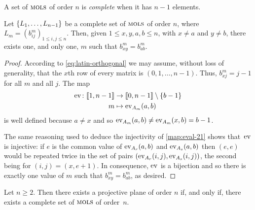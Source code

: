\begin{defn}
    A set of $\mols$ of order $n$ is \textsl{complete} when it has $n-1$ elements.
\end{defn}

\begin{lem}\label{lem:mols-P1}
    Let $\set{L_1,\dots,L_{n-1}}$ be a complete set of $\mols$ of order $n$, where $L_m=(b^m_{ij})_{1\le i,j\le n}$. Then, given $1\le x,y,a,b\le n$, with $x\ne a$ and $y\ne b$, there exists one, and only one, $m$ such that $b^m_{xy}=b^m_{ab}$.
\end{lem}

\begin{proof}
    According to \eqref{eq:latin-orthogonal} we may assume, without loss of generality, that the $x$th row of every matrix is $(0,1,\dots,n-1)$. Thus, $b^m_{xj}=j-1$ for all $m$ and all $j$.
    The map
    \begin{align}\label{map:ev-ab}
        \ev{}\colon\nset{n-1}
            &\to\nset[0]{n-1}\setminus\set{b-1}\\
        m&\mapsto \ev{A_m}(a,b)
    \end{align}
    is well defined because $a\ne x$ and so $\ev{A_m}(a,b)\ne\ev{A_m}(x,b)=b-1$.
    
    The same reasoning used to deduce the injectivity of \eqref{map:eval-21} shows that~$\ev{}$ is injective: if $e$ is the common value of $\ev{A_r}(a,b)$ and $\ev{A_s}(a,b)$ then $(e,e)$ would be repeated twice in the set of pairs $(\ev{A_r}(i,j),\ev{A_s}(i,j))$, the second being for $(i,j)=(x,e+1)$. In consequence, $\ev{}$ is a bijection and so there is exactly one value of $m$ such that $b^m_{xy}=b^m_{ab}$, as desired.
    
\end{proof}

\begin{thm}\label{thm:mols-equivalence}
    Let\/ $n\ge2$. Then there exists a projective plane of order\/ $n$ if, and only if, there exists a complete set of $\mols$ of order\/~$n$.
\end{thm}

